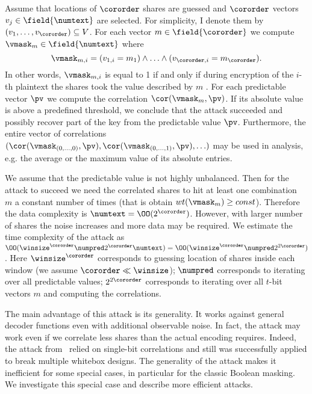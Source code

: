 Assume that locations of $\cororder$ shares are guessed and $\cororder$ vectors $v_j \in \field{\numtext}$ are selected. For simplicity, I denote them by $(v_1, \ldots, v_{\cororder}) \subseteq V$. For each vector $m \in \field{\cororder}$ we compute $\vmask_m \in \field{\numtext}$ where 
$$
\vmask_{m,i}=(v_{1,i} = m_{1}) \land \ldots \land (v_{\cororder,i} = m_{\cororder}).
$$
In other words, $\vmask_{m,i}$ is equal to 1 if and only if during encryption of the $i$-th plaintext the shares took the value described by $m$ .
For each predictable vector $\pv$ we compute the correlation $\cor(\vmask_m, \pv)$.
If its absolute value is above a predefined threshold, we conclude that the attack succeeded and possibly recover part of the key from the predictable value $\pv$. Furthermore, the entire vector of correlations $(\cor(\vmask_{(0,\ldots,0)}, \pv), \cor(\vmask_{(0,\ldots,1)}, \pv), \ldots)$ may be used in analysis, e.g. the average or the maximum value of its absolute entries.

We assume that the predictable value is not highly unbalanced. Then for the attack to succeed we need the correlated shares to hit at least one combination~$m$ a constant number of times (that is obtain $wt(\vmask_{m}) \ge const$). Therefore the data complexity is $\numtext = \OO(2^{\cororder})$. However, with larger number of shares the noise increases and more data may be required. We estimate the time complexity of the attack as $\OO(\winsize^{\cororder} \numpred 2^{\cororder} \numtext) = \OO(\winsize^{\cororder} \numpred 2^{2\cororder})$. Here $\winsize^{\cororder}$ corresponds to guessing location of shares inside each window (we assume $\cororder \ll \winsize$); $\numpred$ corresponds to iterating over all predictable values; $2^{2\cororder}$ corresponds to iterating over all $t$-bit vectors $m$ and computing the correlations.

The main advantage of this attack is its generality. It works against general decoder functions even with additional observable noise. In fact, the attack may work even if we correlate less shares than the actual encoding requires. Indeed, the attack from~\cite{AttackBos} relied on single-bit correlations and still was successfully applied to break multiple whitebox designs. The generality of the attack makes it inefficient for some special cases, in particular for the classic Boolean masking. We investigate this special case and describe more efficient attacks. 


